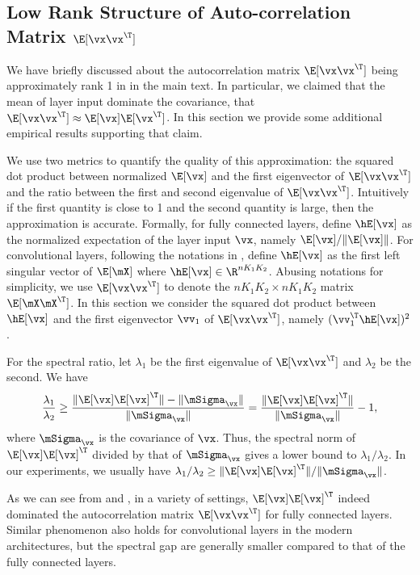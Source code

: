 \subsection{Low Rank Structure of Auto-correlation Matrix \texorpdfstring{$\E[\vx\vx^\T]$}{ExxT}}
\label{sec:appendix_xxT}

We have briefly discussed about the autocorrelation matrix $\E[\vx\vx^\T]$ being approximately rank 1 in  in the main text. In particular, we claimed that the mean of layer input dominate the covariance, that $\E[\vx\vx^\T]\approx \E[\vx]\E[\vx^\T]$. In this section we provide some additional empirical results supporting that claim.

We use two metrics to quantify the quality of this approximation: the squared dot product between normalized $\E[\vx]$ and the first eigenvector of $\E[\vx\vx^\T]$ and the ratio between the first and second eigenvalue of $\E[\vx\vx^\T]$. Intuitively if the first quantity is close to 1 and the second quantity is large, then the approximation is accurate.
Formally, for fully connected layers, define $\hE[\vx]$ as the normalized expectation of the layer input $\vx$, namely ${\E[\vx]}/{\|\E[\vx]\|}$.
For convolutional layers, following the notations in , define $\hE[\vx]$ as the first left singular vector of $\E[\mX]$ where $\hE[\vx]\in \R^{nK_1K_2}$. Abusing notations for simplicity, we use $\E[\vx\vx^\T]$ to denote the $nK_1K_2\times nK_1K_2$ matrix $\E[\mX\mX^\T]$. In this section we consider the squared dot product between $\hE[\vx]$ and the first eigenvector $\vv_1$ of $\E[\vx\vx^\T]$, namely $(\vv_1^\T\hE[\vx])^2$.

For the spectral ratio, let $\lambda_1$ be the first eigenvalue of $\E[\vx\vx^\T]$ and $\lambda_2$ be the second. We have
\begin{equation}
    \frac{\lambda_1}{\lambda_2} \geq \frac{\|\E[\vx]\E[\vx]^\T\|-\|\mSigma_\vx\| }{\|\mSigma_\vx\|} = \frac{\|\E[\vx]\E[\vx]^\T\|}{\|\mSigma_\vx\|} -1,
\end{equation}
where $\mSigma_\vx$ is the covariance of $\vx$. Thus, the spectral norm of $\E[\vx]\E[\vx]^\T$ divided by that of $\mSigma_\vx$ gives a lower bound to ${\lambda_1}/{\lambda_2}$. In our experiments, we usually have
${\lambda_1}/{\lambda_2} \geq {\|\E[\vx]\E[\vx]^\T\|}/{\|\mSigma_\vx\|}$.

As we can see from  and , in a variety of settings, $\E[\vx]\E[\vx]^\T$ indeed dominated the autocorrelation matrix $\E[\vx\vx^\T]$ for fully connected layers. Similar phenomenon also holds for convolutional layers in the modern architectures, but the spectral gap are generally smaller compared to that of the fully connected layers.
 
